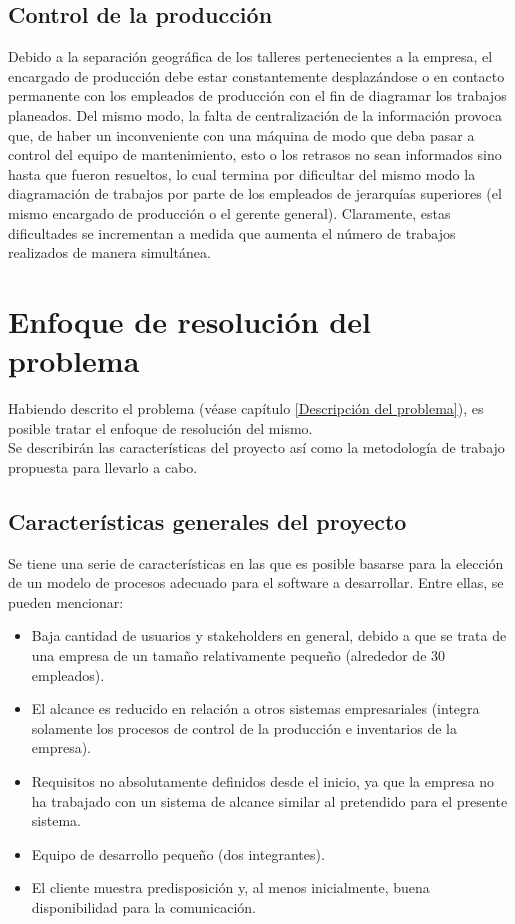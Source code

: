 \documentclass[a4paper, 12pt,twoside]{report}  %
\numberwithin{equation}{subsection} %
\begin{document}
\section{Control de la producción}

Debido a la separación geográfica de los talleres pertenecientes a la empresa, el encargado de producción debe estar constantemente desplazándose o en contacto permanente con los empleados de producción con el fin de diagramar los trabajos planeados. Del mismo modo, la falta de centralización de la información provoca que, de haber un inconveniente con una máquina de modo que deba pasar a control del equipo de mantenimiento, esto o los retrasos no sean informados sino hasta que fueron resueltos, lo cual termina por dificultar del mismo modo la diagramación de trabajos por parte de los empleados de jerarquías superiores (el mismo encargado de producción o el gerente general). Claramente, estas dificultades se incrementan a medida que aumenta el número de trabajos realizados de manera simultánea.

\chapter{Enfoque de resolución del problema}

Habiendo descrito el problema (véase capítulo \ref{Descripción del problema}), es posible tratar el enfoque de resolución del mismo.\\
\indent Se describirán las características del proyecto así como la metodología de trabajo propuesta para llevarlo a cabo.

\section{Características generales del proyecto}
\label{Caracteristicas_generales_del_proyecto}
Se tiene una serie de características en las que es posible basarse para la elección de un modelo de procesos adecuado para el software a desarrollar. Entre ellas, se pueden mencionar:
\begin{itemize}
	\item Baja cantidad de usuarios y stakeholders en general, debido a que se trata de una empresa de un tamaño relativamente pequeño (alrededor de 30 empleados).
	\item El alcance es reducido en relación a otros sistemas empresariales (integra solamente los procesos de control de la producción e inventarios de la empresa).
	\item Requisitos no absolutamente definidos desde el inicio, ya que la empresa no ha trabajado con un sistema de alcance similar al pretendido para el presente sistema.
	\item Equipo de desarrollo pequeño (dos integrantes).
	\item El cliente muestra predisposición y, al menos inicialmente, buena disponibilidad para la comunicación.
\end{itemize}
\end{document}

